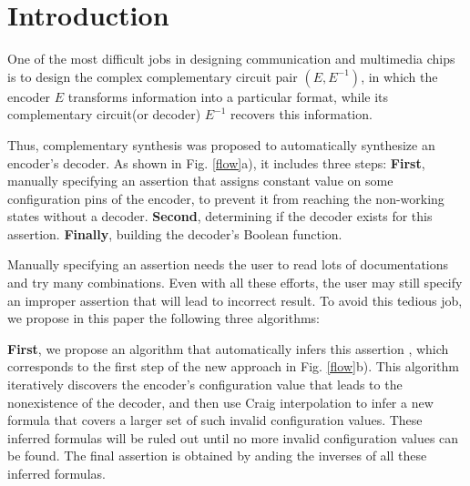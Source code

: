\documentclass[journal]{IEEEtran}
\begin{document}
%
\IEEEpeerreviewmaketitle


\newtheorem{definition11}{\textbf{Definition}}
\newtheorem{lemma}{\textbf{Lemma}}
\newtheorem{theorem}{\textbf{Theorem}}
\newtheorem{proposition}{\textbf{Proposition}}

\section{Introduction}\label{sec_intro}

One of the most difficult jobs in designing communication and multimedia chips
is to design the complex complementary circuit pair $(E,E^{-1})$,
in which the encoder $E$ transforms information into a particular format,
while its complementary circuit(or decoder) $E^{-1}$ recovers this information.

Thus,
complementary synthesis \cite{ShengYuShen:iccad09} was proposed
to automatically synthesize an encoder's decoder.
As shown in Fig. \ref{flow}a),
it includes three steps:
\textbf{First},
manually specifying an assertion that assigns constant value on some configuration pins of the encoder,
to prevent it from reaching the non-working states without a decoder.
\textbf{Second},
determining if the decoder exists for this assertion.
\textbf{Finally},
building the decoder's Boolean function.

Manually specifying an assertion needs the user to read lots of documentations and try many combinations.
Even with all these efforts,
the user may still specify an improper assertion that will lead to incorrect result.
To avoid this tedious job,
we propose in this paper the following three algorithms:

\textbf{First},
we propose an algorithm that automatically infers this assertion \cite{ShengYuShen:iccad11},
which corresponds to the first step of the new approach in Fig. \ref{flow}b).
This algorithm iteratively discovers the encoder's configuration value that leads to the nonexistence of the decoder,
and then use Craig interpolation to infer a new formula that covers a larger set of such invalid configuration values.
These inferred formulas will be ruled out until no more invalid configuration values can be found.
The final assertion is obtained by anding the inverses of all these inferred formulas.
\end{document}
